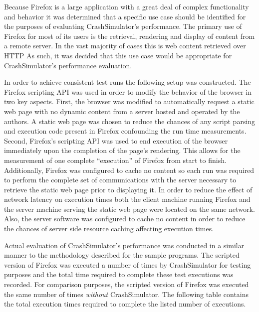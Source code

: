                 Because Firefox is a large application with a great deal of complex functionality and behavior it was
                determined that a specific use case should be identified for the purposes of evaluating CrashSimulator's
                performance. The primary use of Firefox for most of its users is the retrieval, rendering and display of
                content from a remote server. In the vast majority of cases this is web content retrieved over HTTP As
                such, it was decided that this use case would be appropriate for CrashSimulator's performance
                evaluation.

                In order to achieve consistent test runs the following setup was constructed. The Firefox scripting API
                was used in order to modify the behavior of the browser in two key aspects. First, the browser was
                modified to automatically request a static web page with no dynamic content from a server hosted and
                operated by the authors. A static web page was chosen to reduce the chances of any script parsing and
                execution code present in Firefox confounding the run time measurements. Second, Firefox's scripting API
                was used to end execution of the browser immediately upon the completion of the page's rendering. This
                allows for the measurement of one complete ``execution'' of Firefox from start to finish. Additionally,
                Firefox was configured to cache no content so each run was required to perform the complete set of
                communications with the server necessary to retrieve the static web page prior to displaying it. In
                order to reduce the effect of network latency on execution times both the client machine running Firefox
                and the server machine serving the static web page were located on the same network. Also, the server
                software was configured to cache no content in order to reduce the chances of server side resource
                caching affecting execution times.

                Actual evaluation of CrashSimulator's performance was conducted in a similar manner to the methodology
                described for the sample programs. The scripted version of Firefox was executed a number of times by
                CrashSimulator for testing purposes and the total time required to complete these test executions was
                recorded. For comparison purposes, the scripted version of Firefox was executed the same number of times
                \emph{without} CrashSimulator.  The following table contains the total execution times required to
                complete the listed number of executions.

